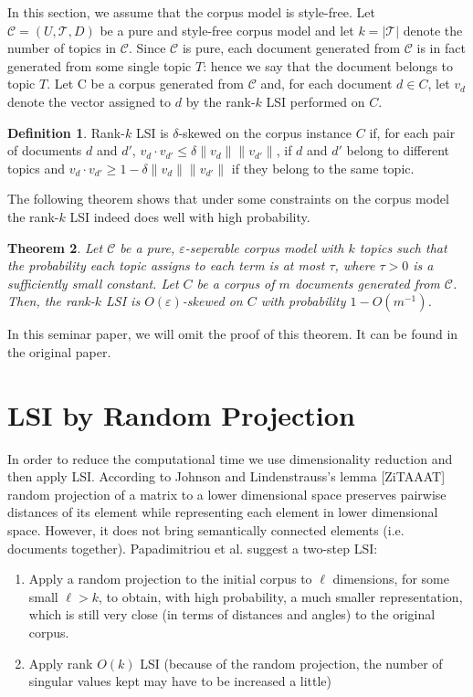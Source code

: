 \documentclass[a4paper,11pt,DIV=15]{scrartcl} %
\renewcommand{\epsilon}{\varepsilon}
\theoremstyle{plain}
\newtheorem{theorem}{Theorem}
\theoremstyle{definition}
\newtheorem{definition}[theorem]{Definition}
\begin{document}
In this section, we assume that the corpus model is style-free.
Let $\mathscr{C} = (U,\mathscr{T}, D)$ be a pure and style-free corpus model and let $k = |\mathscr{T}|$ denote the number of topics in $\mathscr{C}$. Since $\mathscr{C}$ is pure, each document generated from $\mathscr{C}$ is in fact generated from some single topic $T$: hence we say that the document belongs to topic $T$.
Let C be a corpus generated from $\mathscr{C}$ and, for each document $d \in C$, let $v_d$ denote the vector assigned to $d$ by the rank-$k$ LSI performed on $C$.



\begin{definition}
    Rank-$k$ LSI is $\delta$-skewed on the corpus instance $C$ if, for each pair of documents $d$ and $d'$, $v_d \cdot v_{d'} \leq \delta \lVert v_d \rVert \lVert v_{d'}\rVert$,  if $d$ and $d'$ belong to different topics and $v_d \cdot v_{d'} \geq 1 - \delta  \lVert v_d \rVert \lVert v_{d'}\rVert$  if they belong to the same topic.
\end{definition}
The following theorem shows that under some constraints on the corpus model the rank-$k$ LSI indeed does well with high probability.

\begin{theorem}
    Let $\mathscr{C}$ be a pure, $\epsilon$-seperable corpus model with $k$ topics such that the probability each topic assigns to each term is at most $\tau$, where $\tau > 0$ is a sufficiently small constant. Let $C$ be a corpus of $m$ documents generated from $\mathscr{C}$. Then, the rank-$k$ LSI is $O(\epsilon)$-skewed on $C$ with probability $1-O(m^{-1})$.
\end{theorem}

In this seminar paper, we will omit the proof of this theorem. It can be found in the original paper.







\section{LSI by Random Projection} %
In order to reduce the computational time we use dimensionality reduction and then apply LSI.
According to Johnson and Lindenstrauss's lemma [ZiTAAAT]  random projection of a matrix to a lower dimensional space preserves pairwise distances of its element while representing each element in lower dimensional space. However, it does not bring semantically connected elements (i.e. documents together).  Papadimitriou et al. suggest a two-step LSI:
\begin{enumerate}
    \item  Apply a random projection to the initial corpus to $\ell$ dimensions, for some
small $\ell > k$, to obtain, with high probability, a much smaller representation, which
is still very close (in terms of distances and angles) to the original corpus.

\item Apply rank $O(k)$ LSI (because of the random projection, the number of
singular values kept may have to be increased a little)
\end{enumerate}
\end{document}
